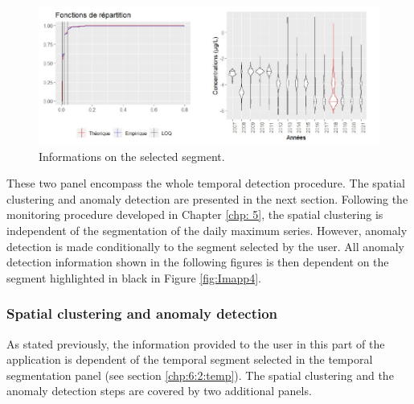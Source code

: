 \begin{figure}[htbp]
  \centering
  \includegraphics[]{figs/Chap6/Im_appbis5.pdf}
  \caption{Informations on the selected segment.}
  \label{fig:Imapp5}
\end{figure}

These two panel encompass the whole temporal detection procedure. The spatial clustering and anomaly detection are presented in the next section. Following the monitoring procedure developed in Chapter \ref{chp: 5}, the spatial clustering is independent of the segmentation of the daily maximum series. However, anomaly detection is made conditionally to the segment selected by the user. All anomaly detection information shown in the following figures is then dependent on the segment highlighted in black in Figure \ref{fig:Imapp4}.



\subsubsection{Spatial clustering and anomaly detection}\label{chp:6:2:spat}


As stated previously, the information provided to the user in this part of the application is dependent of the temporal segment selected in the temporal segmentation panel (see section \ref{chp:6:2:temp}). The spatial clustering and the anomaly detection steps are covered by two additional panels. 

